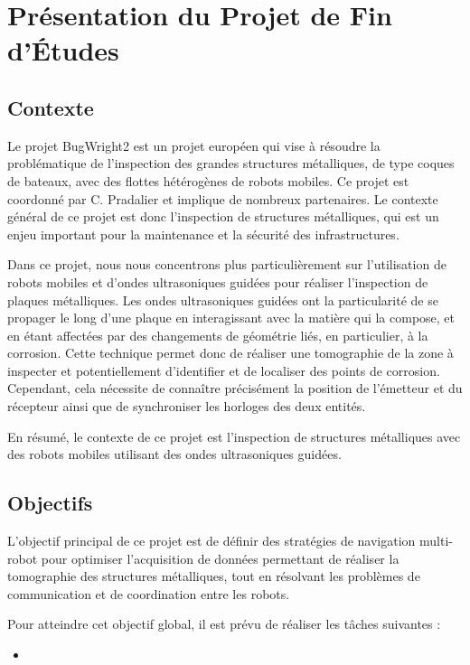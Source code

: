 \documentclass[init,francais,RandD]{rapportPFE}  %
\begin{document}
	\section{Présentation du Projet de Fin d'Études}
		\subsection{Contexte}
			Le projet BugWright2 est un projet européen qui vise à résoudre la problématique de l'inspection des grandes structures métalliques, de type coques de bateaux, avec des flottes hétérogènes de robots mobiles. Ce projet est coordonné par C. Pradalier et implique de nombreux partenaires. Le contexte général de ce projet est donc l'inspection de structures métalliques, qui est un enjeu important pour la maintenance et la sécurité des infrastructures.

			Dans ce projet, nous nous concentrons plus particulièrement sur l'utilisation de robots mobiles et d'ondes ultrasoniques guidées pour réaliser l'inspection de plaques métalliques. Les ondes ultrasoniques guidées ont la particularité de se propager le long d'une plaque en interagissant avec la matière qui la compose, et en étant affectées par des changements de géométrie liés, en particulier, à la corrosion. Cette technique permet donc de réaliser une tomographie de la zone à inspecter et potentiellement d'identifier et de localiser des points de corrosion. Cependant, cela nécessite de connaître précisément la position de l'émetteur et du récepteur ainsi que de synchroniser les horloges des deux entités.

			En résumé, le contexte de ce projet est l'inspection de structures métalliques avec des robots mobiles utilisant des ondes ultrasoniques guidées.
		\subsection{Objectifs}
			L'objectif principal de ce projet est de définir des stratégies de navigation multi-robot pour optimiser l'acquisition de données permettant de réaliser la tomographie des structures métalliques, tout en résolvant les problèmes de communication et de coordination entre les robots.

			Pour atteindre cet objectif global, il est prévu de réaliser les tâches suivantes :
			\begin{itemize}
				\item
			\end{itemize}
\end{document}
